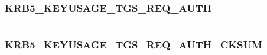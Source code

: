 \documentclass[letterpaper,10pt,english]{sphinxmanual}
\begin{document}
\begin{fulllineitems}
\label{appdev/refs/macros/KRB5_KEYUSAGE_TGS_REQ_AD_SUBKEY:KRB5_KEYUSAGE_TGS_REQ_AD_SUBKEY}
\end{fulllineitems}


\begin{tabulary}{\linewidth}{|L|L|}
\hline

 & 
\\\hline
\end{tabulary}



\subsubsection{KRB5\_KEYUSAGE\_TGS\_REQ\_AUTH}
\label{appdev/refs/macros/KRB5_KEYUSAGE_TGS_REQ_AUTH::doc}\label{appdev/refs/macros/KRB5_KEYUSAGE_TGS_REQ_AUTH:krb5-keyusage-tgs-req-auth}\label{appdev/refs/macros/KRB5_KEYUSAGE_TGS_REQ_AUTH:krb5-keyusage-tgs-req-auth-data}

\begin{fulllineitems}
\label{appdev/refs/macros/KRB5_KEYUSAGE_TGS_REQ_AUTH:KRB5_KEYUSAGE_TGS_REQ_AUTH}
\end{fulllineitems}


\begin{tabulary}{\linewidth}{|L|L|}
\hline

 & 
\\\hline
\end{tabulary}



\subsubsection{KRB5\_KEYUSAGE\_TGS\_REQ\_AUTH\_CKSUM}
\label{appdev/refs/macros/KRB5_KEYUSAGE_TGS_REQ_AUTH_CKSUM:krb5-keyusage-tgs-req-auth-cksum-data}\label{appdev/refs/macros/KRB5_KEYUSAGE_TGS_REQ_AUTH_CKSUM::doc}\label{appdev/refs/macros/KRB5_KEYUSAGE_TGS_REQ_AUTH_CKSUM:krb5-keyusage-tgs-req-auth-cksum}

\begin{fulllineitems}
\label{appdev/refs/macros/KRB5_KEYUSAGE_TGS_REQ_AUTH_CKSUM:KRB5_KEYUSAGE_TGS_REQ_AUTH_CKSUM}
\end{fulllineitems}
\end{document}
